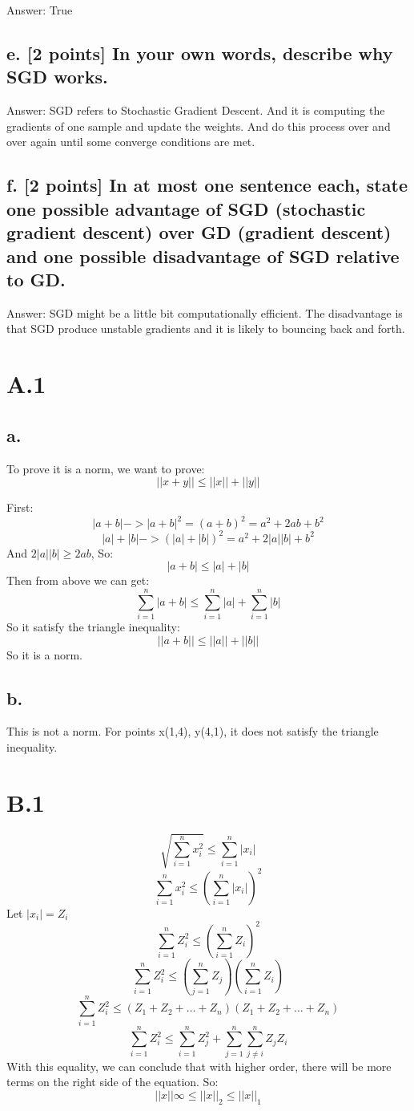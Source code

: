 \documentclass{article}
\begin{document}
Answer: True

\subsection*{e. [2 points] In your own words, describe why SGD works.}

Answer: SGD refers to Stochastic Gradient Descent. And it is computing the gradients of one sample and update the weights. And do this process over and over again until some converge conditions are met.

\subsection*{f. [2 points] In at most one sentence each, state one possible advantage of SGD (stochastic gradient descent) over GD (gradient descent) and one possible disadvantage of SGD relative to GD.}

Answer: SGD might be a little bit computationally efficient. The disadvantage is that SGD produce unstable gradients and it is likely to bouncing back and forth.


\section*{A.1}

\subsection*{a.}
To prove it is a norm, we want to prove:
\[ ||x+y|| \le ||x|| + ||y||  \]

First:
\[ |a+b| -> |a+b|^2 = (a+b)^2 = a^2 + 2ab + b^2\]
\[ |a| + |b| -> (|a| + |b|)^2 = a^2 + 2|a||b| + b^2 \]
And $2|a||b| \ge 2ab$,
So:
\[ |a+b| \le |a| + |b| \]
Then from above we can get:
\[ \sum_{i=1}^{n}|a+b| \le \sum_{i=1}^{n}|a| + \sum_{i=1}^{n}|b| \]
So it satisfy the triangle inequality:
\[ ||a+b|| \le ||a|| + ||b||  \]
So it is a norm.

\subsection*{b.}
This is not a norm. For points x(1,4), y(4,1), it does not satisfy the triangle inequality. 

\section*{B.1}
\[ \sqrt{\sum_{i=1}^{n} x_i^2}  \le \sum_{i=1}^{n} |x_i|\]
\[ \sum_{i=1}^{n} x_i^2 \le (\sum_{i=1}^{n} |x_i|)^2 \]
Let $|x_i| = Z_i$
\[ \sum_{i=1}^{n} Z_i^2 \le  (\sum_{i=1}^{n} Z_i)^2\]
\[\sum_{i=1}^{n} Z_i^2 \le  (\sum_{j=1}^{n}Z_j) (\sum_{i=1}^{n} Z_i) \]
\[ \sum_{i=1}^{n} Z_i^2 \le (Z_1+Z_2+ \dots + Z_n) (Z_1+Z_2+ \dots + Z_n) \]
\[ \sum_{i=1}^{n} Z_i^2 \le  \sum_{i=1}^{n}Z_j^2 + \sum_{j=1}^{n} \sum_{j \ne i}^{n} Z_j Z_i\]
With this equality, we can conclude that with higher order, there will be more terms on the right side of the equation. So:
\[ ||x|| \infty \le ||x||_2 \le ||x||_1 \]
\end{document}
